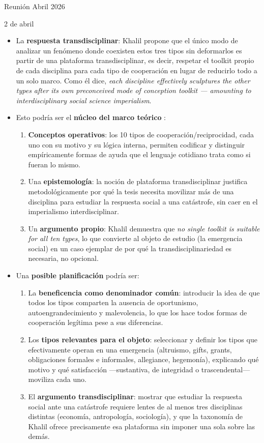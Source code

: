 \documentclass[a4paper,11pt]{article}
\newcommand{\resaltar}[1]{%
    \textcolor{micolor}{\textbf{\Large #1}}%
}
\begin{document}
\begin{seccionbox}[violetasuave]{Reunión Abril 2026}
\begin{updateo}{2 de abril}
\begin{itemize}
                \item La \textbf{respuesta transdisciplinar}: Khalil propone que el único modo de analizar un fenómeno donde coexisten estos tres tipos sin deformarlos es partir de una plataforma transdisciplinar, es decir, respetar el toolkit propio de cada disciplina para cada tipo de cooperación en lugar de reducirlo todo a un solo marco. Como él dice, \textit{each discipline effectively sculptures the other types after its own preconceived mode of conception toolkit — amounting to interdisciplinary social science imperialism}.
                \item Esto podría ser el \resaltar{núcleo del marco teórico}:
                \begin{enumerate}
                    \item \textbf{Conceptos operativos}: los 10 tipos de cooperación/reciprocidad, cada uno con su motivo y su lógica interna, permiten codificar y distinguir empíricamente formas de ayuda que el lenguaje cotidiano trata como si fueran lo mismo.
                    \item Una \textbf{epistemología}: la noción de plataforma transdisciplinar justifica metodológicamente por qué la tesis necesita movilizar más de una disciplina para estudiar la respuesta social a una catástrofe, sin caer en el imperialismo interdisciplinar.
                    \item Un \textbf{argumento propio}: Khalil demuestra que \textit{no single toolkit is suitable for all ten types}, lo que convierte al objeto de estudio (la emergencia social) en un caso ejemplar de por qué la transdisciplinariedad es necesaria, no opcional.
                \end{enumerate}
                \item Una \resaltar{posible planificación} podría ser:
                \begin{enumerate}
                    \item La \textbf{beneficencia como denominador común}: introducir la idea de que todos los tipos comparten la ausencia de oportunismo, autoengrandecimiento y malevolencia, lo que los hace todos formas de cooperación legítima pese a sus diferencias.
                    \item Los \textbf{tipos relevantes para el objeto}: seleccionar y definir los tipos que efectivamente operan en una emergencia (altruismo, gifts, grants, obligaciones formales e informales, allegiance, hegemonía), explicando qué motivo y qué satisfacción —sustantiva, de integridad o trascendental— moviliza cada uno.
                    \item El \textbf{argumento transdisciplinar}: mostrar que estudiar la respuesta social ante una catástrofe requiere lentes de al menos tres disciplinas distintas (economía, antropología, sociología), y que la taxonomía de Khalil ofrece precisamente esa plataforma sin imponer una sola sobre las demás.
                \end{enumerate}
            

\end{itemize}
\end{updateo}
\end{seccionbox}
\end{document}
